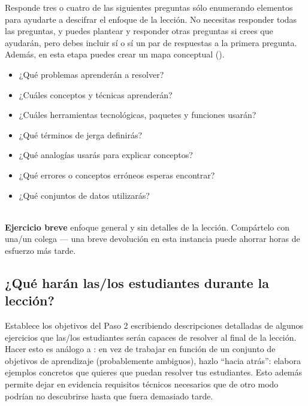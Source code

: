 Responde tres o cuatro de las siguientes preguntas sólo enumerando elementos
para ayudarte a descifrar el enfoque de la lección.
No necesitas responder todas las preguntas,
y puedes plantear y responder otras preguntas si crees que ayudarán,
pero debes incluir sí o sí un par de respuestas a la primera pregunta.
Además, en esta etapa puedes crear un mapa conceptual ().

\begin{itemize}

\item
  ¿Qué problemas aprenderán a resolver?

\item
  ¿Cuáles conceptos y técnicas aprenderán?

\item
  ¿Cuáles herramientas tecnológicas, paquetes y funciones usarán?

\item
  ¿Qué términos de jerga definirás?

\item
  ¿Qué analogías usarás para explicar conceptos?

\item
  ¿Qué errores o conceptos erróneos esperas encontrar?

\item
  ¿Qué conjuntos de datos utilizarás?

\end{itemize}

~\\
\noindent
\textbf{Ejercicio breve}
enfoque general y sin detalles de la lección.
Compártelo con una/un colega --- una breve devolución en esta instancia
puede ahorrar horas de esfuerzo más tarde.

\subsection*{¿Qué harán las/los estudiantes durante la lección?}

Establece los objetivos del Paso 2 escribiendo descripciones detalladas de
algunos ejercicios que las/los estudiantes serán capaces de resolver al final de la lección.
Hacer esto es análogo a :
en vez de trabajar en función de un conjunto de objetivos de aprendizaje (probablemente ambiguos),
hazlo ``hacia atrás'': elabora ejemplos concretos que quieres que puedan resolver tus estudiantes.
Esto además permite dejar en evidencia requisitos técnicos necesarios
que de otro modo podrían no descubrirse hasta que fuera demasiado tarde.

